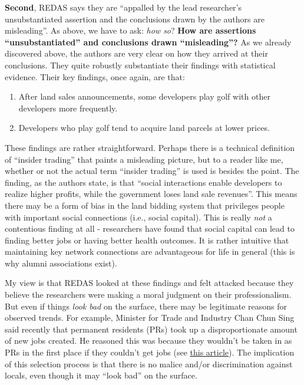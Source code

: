 \documentclass[
  openany]{book}
\providecommand{\tightlist}{%
  \setlength{\itemsep}{0pt}\setlength{\parskip}{0pt}}
\begin{document}
\textbf{Second}, REDAS says they are ``appalled by the lead researcher's unsubstantiated assertion and the conclusions drawn by the authors are misleading''. As above, we have to ask: \emph{how so}? \textbf{How are assertions ``unsubstantiated'' and conclusions drawn ``misleading''?} As we already discovered above, the authors are very clear on how they arrived at their conclusions. They quite robustly substantiate their findings with statistical evidence. Their key findings, once again, are that:

\begin{enumerate}
\def\labelenumi{\arabic{enumi}.}
\tightlist
\item
  After land sales announcements, some developers play golf with other developers more frequently.
\item
  Developers who play golf tend to acquire land parcels at lower prices.
\end{enumerate}

These findings are rather straightforward. Perhaps there is a technical definition of ``insider trading'' that paints a misleading picture, but to a reader like me, whether or not the actual term ``insider trading'' is used is besides the point. The finding, as the authors state, is that ``social interactions enable developers to realize higher profits, while the government loses land sale revenues''. This means there may be a form of bias in the land bidding system that privileges people with important social connections (i.e., social capital). This is really \emph{not} a contentious finding at all - researchers have found that social capital can lead to finding better jobs or having better health outcomes. It is rather intuitive that maintaining key network connections are advantageous for life in general (this is why alumni associations exist).

My view is that REDAS looked at these findings and felt attacked because they believe the researchers were making a moral judgment on their professionalism. But even if things \emph{look bad} on the surface, there may be legitimate reasons for observed trends. For example, Minister for Trade and Industry Chan Chun Sing said recently that permanent residents (PRs) took up a disproportionate amount of new jobs created. He reasoned this was because they wouldn't be taken in as PRs in the first place if they couldn't get jobs (see \href{https://www.todayonline.com/singapore/prs-took-about-17-net-new-jobs-created-spore-between-2015-and-2018-chan-chun-sing}{this article}). The implication of this selection process is that there is no malice and/or discrimination against locals, even though it may ``look bad'' on the surface.
\end{document}
